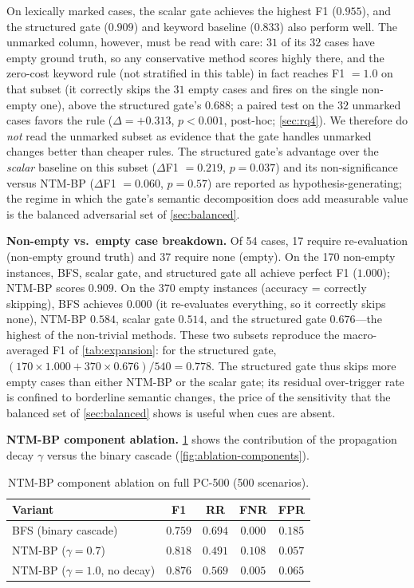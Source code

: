 \documentclass{article}
\theoremstyle{definition}
\begin{document}
On lexically marked cases, the scalar gate achieves the highest F1
($0.955$), and the structured gate ($0.909$) and keyword baseline
($0.833$) also perform well.  The unmarked column, however, must be read
with care: $31$ of its $32$ cases have empty ground truth, so any
conservative method scores highly there, and the zero-cost keyword rule
(not stratified in this table) in fact reaches F1 $=1.0$ on that subset
(it correctly skips the $31$ empty cases and fires on the single
non-empty one), above the structured gate's $0.688$; a paired test on the
$32$ unmarked cases favors the rule ($\Delta=+0.313$, $p<0.001$,
post-hoc; \cref{sec:rq4}).  We therefore do \emph{not} read the unmarked
subset as evidence that the gate handles unmarked changes better than
cheaper rules.  The structured gate's advantage over the \emph{scalar}
baseline on this subset ($\Delta$F1 $=0.219$, $p=0.037$) and its
non-significance versus NTM-BP ($\Delta$F1 $=0.060$, $p=0.57$) are
reported as hypothesis-generating; the regime in which the gate's
semantic decomposition does add measurable value is the balanced
adversarial set of \cref{sec:balanced}.

\textbf{Non-empty vs.\ empty case breakdown.}
Of 54 cases, 17 require re-evaluation (non-empty ground truth) and 37
require none (empty).  On the 170 non-empty instances, BFS, scalar gate,
and structured gate all achieve perfect F1 ($1.000$); NTM-BP scores
$0.909$.  On the 370 empty instances (accuracy = correctly skipping), BFS
achieves $0.000$ (it re-evaluates everything, so it correctly skips
none), NTM-BP $0.584$, scalar gate $0.514$, and the structured gate
$0.676$---the highest of the non-trivial methods.  These two subsets
reproduce the macro-averaged F1 of \cref{tab:expansion}: for the
structured gate, $(170\times1.000+370\times0.676)/540=0.778$.  The
structured gate thus skips more empty cases than either NTM-BP or the
scalar gate; its residual over-trigger rate is confined to borderline
semantic changes, the price of the sensitivity that the balanced set of
\cref{sec:balanced} shows is useful when cues are absent.

\textbf{NTM-BP component ablation.}
\cref{tab:ablation-ntmbp} shows the contribution of the propagation
decay $\gamma$ versus the binary cascade (\cref{fig:ablation-components}).

\begin{table}[t]
\centering
\caption{NTM-BP component ablation on full PC-500 (500 scenarios).}
\label{tab:ablation-ntmbp}
\begin{tabular}{lcccc}
\toprule
Variant & F1 & RR & FNR & FPR \\
\midrule
BFS (binary cascade)            & $0.759$ & $0.694$ & $0.000$ & $0.185$ \\
NTM-BP ($\gamma=0.7$)          & $0.818$ & $0.491$ & $0.108$ & $0.057$ \\
NTM-BP ($\gamma=1.0$, no decay) & $0.876$ & $0.569$ & $0.005$ & $0.065$ \\
\bottomrule
\end{tabular}
\end{table}
\end{document}
